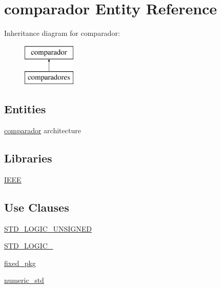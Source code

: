 \hypertarget{classcomparador}{}\section{comparador Entity Reference}
\label{classcomparador}
Inheritance diagram for comparador\+:\begin{figure}[H]
\begin{center}
\leavevmode
\includegraphics[height=2.000000cm]{classcomparador}
\end{center}
\end{figure}
\subsection*{Entities}
\begin{DoxyCompactItemize}
\item 
\hyperlink{classcomparador_1_1comparador}{comparador} architecture
\end{DoxyCompactItemize}
\subsection*{Libraries}
 \begin{DoxyCompactItemize}
\item 
\hyperlink{classcomparador_ae4f03c286607f3181e16b9aa12d0c6d4}{I\+E\+E\+E} 
\end{DoxyCompactItemize}
\subsection*{Use Clauses}
 \begin{DoxyCompactItemize}
\item 
\hyperlink{classcomparador_a241c3e72dd8024cc8ae831b1b2aed7db}{S\+T\+D\+\_\+\+L\+O\+G\+I\+C\+\_\+\+U\+N\+S\+I\+G\+N\+E\+D}   
\item 
\hyperlink{classcomparador_aa4b2b25246a821511120e3149b003563}{S\+T\+D\+\_\+\+L\+O\+G\+I\+C\+\_}   
\item 
\hyperlink{classcomparador_aad86249c80e8c1e7ee1c4748aba748e3}{fixed\+\_\+pkg}   
\item 
\hyperlink{classcomparador_a2edc34402b573437d5f25fa90ba4013e}{numeric\+\_\+std}   
\end{DoxyCompactItemize}
